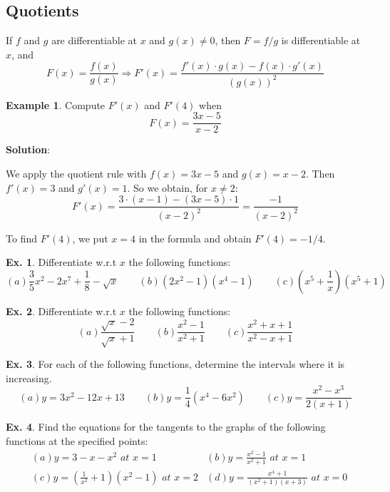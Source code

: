 \documentclass[10pt,a4paper]{book}
\theoremstyle{definition}\newtheorem{definition}{Definition}
\theoremstyle{definition}\newtheorem{fact}{Fact}
\theoremstyle{definition}\newtheorem{ex}{Ex.}
\theoremstyle{definition}\newtheorem{project}{Project}
\theoremstyle{definition}\newtheorem{problem}{Problem}
\theoremstyle{definition}\newtheorem{example}{Example}
\numberwithin{theorem}{chapter}
\numberwithin{corollary}{chapter}
\numberwithin{assumption}{chapter}
\numberwithin{definition}{chapter}
\numberwithin{prop}{chapter}
\numberwithin{notation}{chapter}
\numberwithin{problem}{chapter}
\numberwithin{example}{chapter}
\numberwithin{fact}{chapter}
\numberwithin{ex}{chapter}
\begin{document}
	\subsection{Quotients}
	If $f$ and $g$ are differentiable at $x$ and $g(x)  \neq 0$, then $F = f /g$ is differentiable at $x$, and
	$$F(x) = \frac{f(x)}{g(x)} \Rightarrow F'(x) = \frac{f'(x) \cdot g(x) - f(x) \cdot g'(x)}{(g(x))^2}$$
	
	\begin{example}
		Compute $F'(x)$ and $F'(4)$ when
		$$F(x) = \frac{3x-5}{x-2}$$
		
		\textbf{Solution}:
		
		We apply the quotient rule with $f(x) = 3x-5$ and $g(x) = x-2$. Then $f'(x) = 3$ and $g'(x) = 1$. So we obtain, for $x \neq 2$:
		$$F'(x) = \frac{3 \cdot (x-1) - (3x-5) \cdot 1}{(x-2)^2} = \frac{-1}{(x-2)^2}$$ 
		
		To find $F'(4)$, we put $x=4$ in the formula and obtain $F'(4) = -1/4$.
	\end{example}
	
	\begin{ex}
		Differentiate w.r.t $x$ the following functions:
		\begin{equation*}
			(a) \frac{3}{5}x^2-2x^7+\frac{1}{8}-\sqrt{x} \qquad
			(b) (2x^2-1)(x^4-1) \qquad
			(c) \left( x^5+\frac{1}{x} \right) (x^5+1)
		\end{equation*}
	\end{ex}
	
	\begin{ex}
		Differentiate w.r.t $x$ the following functions:
		\begin{equation*}
			(a) \frac{\sqrt{x}-2}{\sqrt{x}+1} \qquad
			(b) \frac{x^2-1}{x^2+1} \qquad
			(c) \frac{x^2+x+1}{x^2-x+1}
		\end{equation*}
	\end{ex}
	
	\begin{ex}
		For each of the following functions, determine the intervals where it is increasing.
		\begin{equation*}
			(a) y=3x^2-12x+13 \qquad
			(b) y=\frac{1}{4}(x^4-6x^2) \qquad
			(c) y=\frac{x^2-x^3}{2(x+1)}
		\end{equation*}
	\end{ex}
	
	\begin{ex}
		Find the equations for the tangents to the graphs of the following functions at the specified points:
		\begin{align*}
			& (a) y=3-x-x^2 \,\,at\,\, x=1                                 
			& (b) y=\frac{x^2-1}{x^2+1} \,\,at\,\,x=1                      \\
			& (c) y= \left ( \frac{1}{x^2}+1 \right) (x^2-1) \,\,at\,\,x=2 
			& (d) y=\frac{x^4+1}{(x^2+1)(x+3)} \,\,at\,\,x=0               \\
		\end{align*}
	\end{ex}
	
\end{document}
